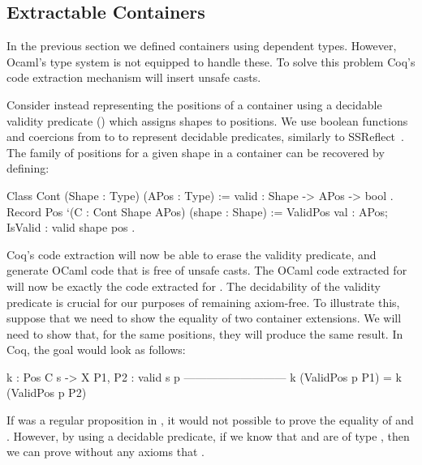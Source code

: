 \documentclass{llncs}
\begin{document}
\subsection{Extractable Containers}
In the previous section we defined containers using dependent types.  However,
Ocaml's type system is not equipped to handle these. To solve this problem
Coq's code extraction mechanism will insert unsafe casts.

Consider instead representing the positions of a container using a decidable
validity predicate () which assigns shapes to positions. We use
boolean functions and coercions from  to  to represent
decidable predicates, similarly to SSReflect~\cite{GonthierL09}. The family of
positions for a given shape in a container can be recovered by defining:
\begin{coqcode}
Class Cont (Shape : Type) (APos : Type) := { valid : Shape -> APos -> bool }.
Record Pos `(C : Cont Shape APos) (shape : Shape) :=
  ValidPos { val : APos; IsValid : valid shape pos }.
\end{coqcode}
Coq's code extraction will now be able to erase the validity predicate, and
generate OCaml code that is free of unsafe casts. The OCaml code extracted for
 will now be exactly the code extracted for .
The decidability of the validity predicate is crucial for our purposes of 
remaining axiom-free. To illustrate this, suppose that we need to show
the equality of two container extensions. We will need to show that, for
the same positions, they will produce the same result. In Coq, the goal
would look as follows: 
\begin{coqcode}
 k : Pos C s -> X
 P1, P2 : valid s p
 ---------------------------
 k (ValidPos p P1) = k (ValidPos p P2)
\end{coqcode}
If  was a regular proposition in , it would not possible
to prove the equality of  and . However, by using a decidable
predicate, if we know that  and  are of type 
, then we can prove without any axioms that 
.


\end{document}
